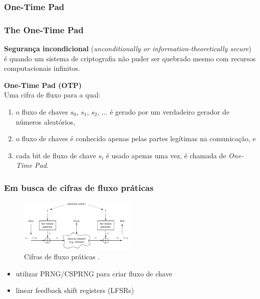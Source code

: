 \subsubsection{One-Time Pad}
\begin{frame}
\frametitle{The One-Time Pad}

\textbf{Segurança incondicional} (\emph{unconditionally or information-theoretically secure}) é quando um sistema de criptografia não puder ser quebrado mesmo com recursos computacionais infinitos.

\textbf{One-Time Pad (OTP)}\\
Uma cifra de fluxo para a qual:
\begin{enumerate}
\item o fluxo de chaves $s_0$, $s_1$, $s_2$, $\ldots$ é gerado por um verdadeiro gerador de números aleatórios, 
\item o fluxo de chaves é conhecido apenas pelas partes legítimas na comunicação, e
\item cada bit de fluxo de chave $s_i$ é usado apenas uma vez,
é chamada de \emph{One-Time Pad}.
\end{enumerate}
\end{frame}


\begin{frame}
\frametitle{Em busca de cifras de fluxo práticas}
\begin{figure}[h]
\centering
\includegraphics[width=0.5\textwidth,height=0.5\textheight,keepaspectratio]{figures/practicalstream.png}
\caption{Cifras de fluxo práticas \cite{paar2014}.}
\label{fig-practicalstream}
\end{figure}

\begin{itemize}
\item utilizar PRNG/CSPRNG para criar fluxo de chave
\item linear feedback shift registers (LFSRs)
\end{itemize}
\end{frame}

